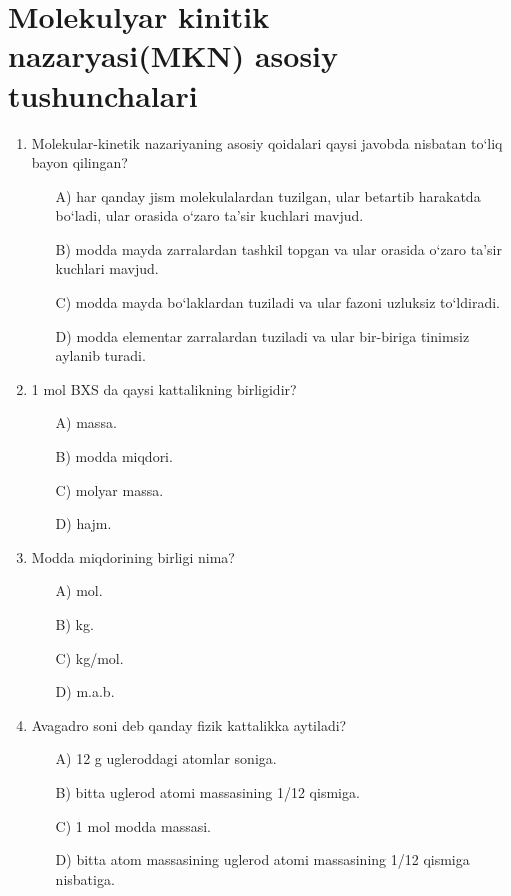 \section{Molekulyar kinitik nazaryasi(MKN) asosiy tushunchalari}


\begin{enumerate}

    \item Molekular-kinetik nazariyaning asosiy qoidalari qaysi javobda nisbatan to‘liq bayon qilingan? 
    \begin{itemize}
        \item[A)] har qanday jism molekulalardan tuzilgan, ular betartib harakatda bo‘ladi, ular orasida o‘zaro ta’sir kuchlari mavjud.
        \item[B)] modda mayda zarralardan tashkil topgan va ular orasida o‘zaro ta’sir kuchlari mavjud.
        \item[C)] modda mayda bo‘laklardan tuziladi va ular fazoni uzluksiz to‘ldiradi.
        \item[D)] modda elementar zarralardan tuziladi va ular bir-biriga tinimsiz aylanib turadi.
     \end{itemize}

    \item 1 mol BXS da qaysi kattalikning birligidir?
    \begin{itemize}
        \item[A)] massa.
        \item[B)] modda miqdori.
        \item[C)] molyar massa.
        \item[D)] hajm.
       
    \end{itemize}

    \item Modda miqdorining birligi nima?
    \begin{itemize}
        \item[A)] mol.
        \item[B)] kg.
        \item[C)] kg/mol.
        \item[D)] m.a.b.
        
    \end{itemize}

    \item Avagadro soni deb qanday fizik kattalikka aytiladi? 
    \begin{itemize}
        \item[A)] 12 g ugleroddagi atomlar soniga.
        \item[B)] bitta uglerod atomi massasining 1/12 qismiga.
        \item[C)] 1 mol modda massasi.
        \item[D)] bitta atom massasining uglerod atomi massasining 1/12 qismiga nisbatiga.
        

\end{itemize}
\end{enumerate}
